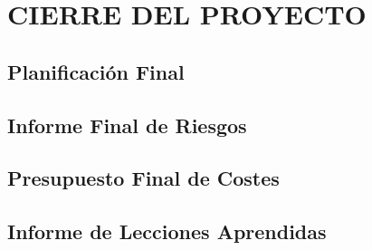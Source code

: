 \newpage
\section{CIERRE DEL PROYECTO}

\subsection{Planificación Final}


\subsection{Informe Final de Riesgos}

\subsection{Presupuesto Final de Costes}



\subsection{Informe de Lecciones Aprendidas}

